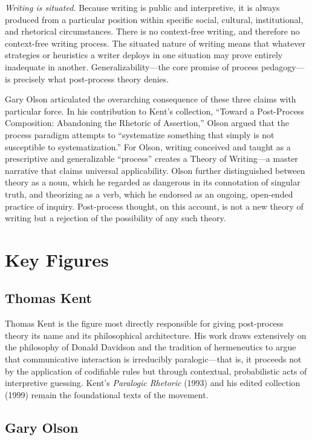 \documentclass[12pt]{article}
\begin{document}
\textit{Writing is situated.} Because writing is public and interpretive, it is always produced from a particular position within specific social, cultural, institutional, and rhetorical circumstances. There is no context-free writing, and therefore no context-free writing process. The situated nature of writing means that whatever strategies or heuristics a writer deploys in one situation may prove entirely inadequate in another. Generalizability---the core promise of process pedagogy---is precisely what post-process theory denies.

Gary Olson articulated the overarching consequence of these three claims with particular force. In his contribution to Kent's collection, ``Toward a Post-Process Composition: Abandoning the Rhetoric of Assertion,'' Olson argued that the process paradigm attempts to ``systematize something that simply is not susceptible to systematization.'' For Olson, writing conceived and taught as a prescriptive and generalizable ``process'' creates a Theory of Writing---a master narrative that claims universal applicability. Olson further distinguished between theory as a noun, which he regarded as dangerous in its connotation of singular truth, and theorizing as a verb, which he endorsed as an ongoing, open-ended practice of inquiry. Post-process thought, on this account, is not a new theory of writing but a rejection of the possibility of any such theory.

\section{Key Figures}

\subsection{Thomas Kent}

Thomas Kent is the figure most directly responsible for giving post-process theory its name and its philosophical architecture. His work draws extensively on the philosophy of Donald Davidson and the tradition of hermeneutics to argue that communicative interaction is irreducibly paralogic---that is, it proceeds not by the application of codifiable rules but through contextual, probabilistic acts of interpretive guessing. Kent's \textit{Paralogic Rhetoric} (1993) and his edited collection (1999) remain the foundational texts of the movement.

\subsection{Gary Olson}
\end{document}
